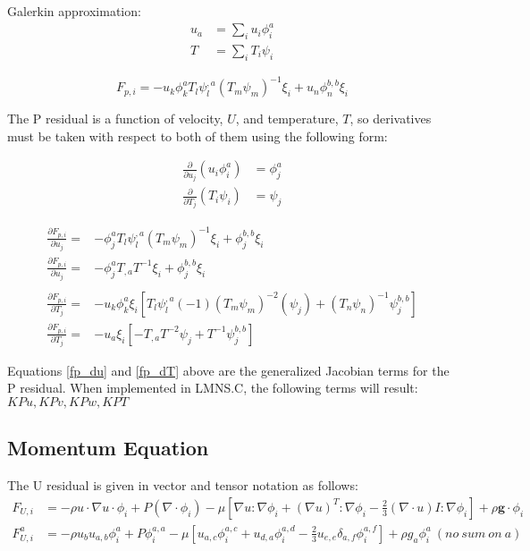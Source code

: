 Galerkin approximation:
\begin{align*}
    u_a &= \sum_i u_i \phi_i^a\\
    T &= \sum_i T_i \psi_i
\end{align*}

\begin{equation}
    F_{p,i} = -u_k \phi_k^a T_l \psi_l^{,a} (T_m \psi_m)^{-1} \xi_i + u_n \phi_n^{b,b} \xi_i
\end{equation}

The P residual is a function of velocity, $U$, and temperature, $T$, so derivatives must be taken with respect to both of them using the following form:

\begin{align*}
    \frac{\partial}{\partial u_j} (u_i \phi_i^a) &= \phi_j^a \\
    \frac{\partial}{\partial T_j} (T_i \psi_i) &= \psi_j
\end{align*}

\begin{align}
    \frac{\partial F_{p,i}}{\partial u_j} = &-\phi_j^{a} T_l \psi_l^{,a} (T_m \psi_m)^{-1} \xi_i + \phi_j^{b,b} \xi_i \nonumber \\
    \frac{\partial F_{p,i}}{\partial u_j} = &-\phi_j^{a} T_{,a} T^{-1} \xi_i + \phi_j^{b,b} \xi_i \label {fp_du}\\ 
    \nonumber \\
    \frac{\partial F_{p,i}}{\partial T_j} = &-u_k \phi_k^a \xi_i \left [ T_l \psi_l^{,a} (-1) (T_m \psi_m)^{-2} (\psi_j) + (T_n \psi_n)^{-1} \psi_j^{b,b} \right ] \nonumber \\
    \frac{\partial F_{p,i}}{\partial T_j} = &-u_a \xi_i \left [ -T_{,a} T^{-2} \psi_j + T^{-1} \psi_j^{b,b} \right ] \label{fp_dT}
\end{align}

Equations \ref{fp_du} and \ref{fp_dT} above are the generalized Jacobian terms for the P residual. When implemented in LMNS.C, the following terms will result:\\
$KPu, KPv, KPw, KPT$

\newpage
\subsection{Momentum Equation}
The U residual is given in vector and tensor notation as follows:
\begin{align}
    F_{U,i} &= -\rho u \cdot \nabla u \cdot \phi_i + P(\nabla \cdot \phi_i) - \mu \left [\nabla u : \nabla \phi_i + (\nabla u)^T : \nabla \phi_i - \frac{2}{3} (\nabla \cdot u) I : \nabla \phi_i \right ] + \rho \mathbf{g} \cdot \phi_i \\
    F_{U,i}^a &= -\rho u_b u_{a,b} \phi_i^a + P\phi_i^{a,a} - \mu \left [u_{a,c} \phi_i^{a,c} + u_{d,a} \phi_i^{a,d} - \frac{2}{3} u_{e,e} \delta_{a,f} \phi_i^{a,f} \right ] + \rho g_a \phi_i^a \ (no \ sum \ on \ a) \label{Fui_tensor}
\end{align}

